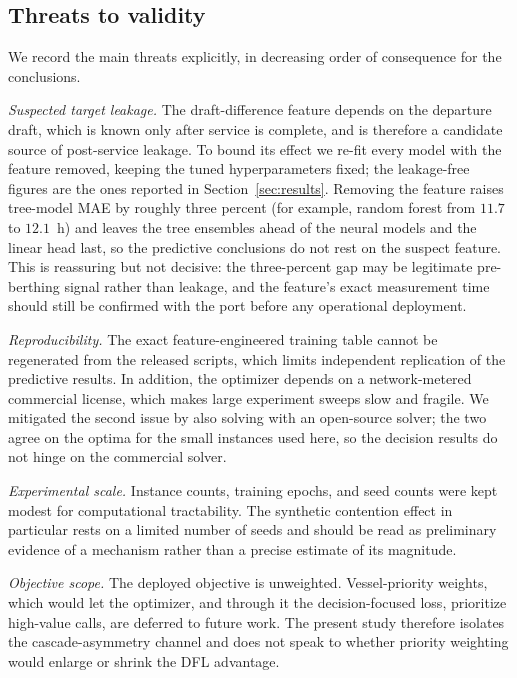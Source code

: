 \subsection{Threats to validity}\label{sec:disc-threats}

We record the main threats explicitly, in decreasing order of consequence for the
conclusions.

\emph{Suspected target leakage.} The draft-difference feature depends on the
departure draft, which is known only after service is complete, and is therefore
a candidate source of post-service leakage. To bound its effect we re-fit every
model with the feature removed, keeping the tuned hyperparameters fixed; the
leakage-free figures are the ones reported in Section~\ref{sec:results}. Removing
the feature raises tree-model MAE by roughly three percent (for example, random
forest from $11.7$ to $12.1$~h) and leaves the tree ensembles ahead of the
neural models and the linear head last, so the predictive conclusions do not
rest on the suspect feature. This is reassuring but
not decisive: the three-percent gap may be legitimate pre-berthing signal rather
than leakage, and the feature's exact measurement time should still be confirmed
with the port before any operational deployment.

\emph{Reproducibility.} The exact feature-engineered training table cannot be
regenerated from the released scripts, which limits independent replication of
the predictive results. In addition, the optimizer depends on a
network-metered commercial license, which makes large experiment sweeps slow and
fragile. We mitigated the second issue by also solving with an open-source
solver; the two agree on the optima for the small instances used here, so the
decision results do not hinge on the commercial solver.

\emph{Experimental scale.} Instance counts, training epochs, and seed counts were
kept modest for computational tractability. The synthetic contention effect in
particular rests on a limited number of seeds and should be read as preliminary
evidence of a mechanism rather than a precise estimate of its magnitude.

\emph{Objective scope.} The deployed objective is unweighted. Vessel-priority
weights, which would let the optimizer, and through it the decision-focused loss,
prioritize high-value calls, are deferred to future work. The present study
therefore isolates the cascade-asymmetry channel and does not speak to whether
priority weighting would enlarge or shrink the DFL advantage.

